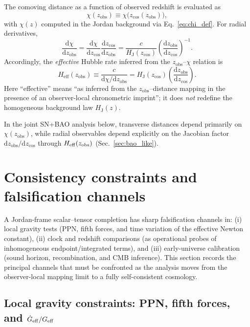 \documentclass[10pt]{article}
\newcommand{\zobs}{z_{\mathrm{obs}}}
\newcommand{\zcos}{z_{\mathrm{cos}}}
\newcommand{\chis}{\chi}
\providecommand{\dd}{\mathrm{d}}
\newcommand{\HJ}{H_{\mathrm{J}}}
\begin{document}
The comoving distance as a function of observed redshift is evaluated as
\begin{equation}
\chis(\zobs) \equiv \chis\!\bigl(\zcos(\zobs)\bigr),
\end{equation}
with $\chis(z)$ computed in the Jordan background via Eq.~\eqref{eq:chi_def}. For radial derivatives,
\begin{equation}
\frac{\dd \chis}{\dd \zobs}
= \frac{\dd \chis}{\dd \zcos}\frac{\dd \zcos}{\dd \zobs}
= \frac{c}{\HJ(\zcos)}\left(\frac{\dd \zobs}{\dd \zcos}\right)^{-1}.
\end{equation}
Accordingly, the \emph{effective} Hubble rate inferred from the $\zobs$--$\chis$ relation is
\begin{equation}
H_{\mathrm{eff}}(\zobs)\equiv \frac{c}{\dd \chis/\dd \zobs}
= \HJ(\zcos)\left(\frac{\dd \zobs}{\dd \zcos}\right).
\label{eq:Heff_def}
\end{equation}
Here ``effective'' means ``as inferred from the $\zobs$--distance mapping in the presence of an
observer-local chronometric imprint''; it does \emph{not} redefine the homogeneous background law $\HJ(z)$.

In the joint SN+BAO analysis below, transverse distances depend primarily on $\chis(\zobs)$, while
radial observables depend explicitly on the Jacobian factor $\dd \zobs/\dd \zcos$ through
$H_{\rm eff}(\zobs)$ (Sec.~\ref{sec:bao_like}).

\section{Consistency constraints and falsification channels}
\label{sec:constraints_main}

A Jordan-frame scalar--tensor completion has sharp falsification channels in:
(i) local gravity tests (PPN, fifth forces, and time variation of the effective Newton constant),
(ii) clock and redshift comparisons (as operational probes of inhomogeneous endpoint/integrated terms),
and (iii) early-universe calibration (sound horizon, recombination, and CMB inference).
This section records the principal channels that must be confronted as the analysis moves from the
observer-local mapping limit to a fully self-consistent cosmology.

\subsection{Local gravity constraints: PPN, fifth forces, and $\dot G_{\rm eff}/G_{\rm eff}$}
\label{sec:constraints_clocks}
\end{document}
